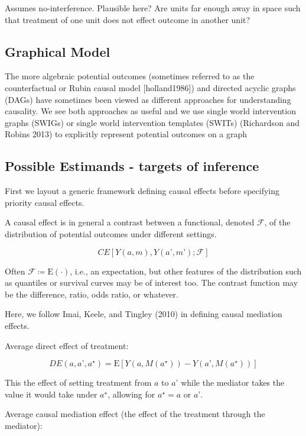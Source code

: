 \documentclass[]{article}
\begin{document}
Assumes no-interference. Plausible here? Are units far enough away in
space such that treatment of one unit does not effect outcome in another
unit?

\subsection{Graphical Model}\label{graphical-model}

The more algebraic potential outcomes (sometimes referred to as the
counterfactual or Rubin causal model {[}holland1986{]}) and directed
acyclic graphs (DAGs) have sometimes been viewed as different approaches
for understanding causality. We see both approaches as useful and we use
single world intervention graphs (SWIGs) or single world intervention
templates (SWITs) (Richardson and Robins 2013) to explicitly represent
potential outcomes on a graph

\subsection{Possible Estimands - targets of
inference}\label{possible-estimands---targets-of-inference}

First we layout a generic framework defining causal effects before
specifying priority causal effects.

A causal effect is in general a contrast between a functional, denoted
\(\mathcal{F}\), of the distribution of potential outcomes under
different settings.

\[
CE[Y(a, m), Y(a’, m’); \mathcal{F}]
\]

Often \(\mathcal{F} \coloneqq \mathrm{E}(\cdot)\), i.e., an expectation,
but other features of the distribution such as quantiles or survival
curves may be of interest too. The contrast function may be the
difference, ratio, odds ratio, or whatever.

Here, we follow Imai, Keele, and Tingley (2010) in defining causal
mediation effects.

Average direct effect of treatment:

\[
DE(a, a’, a^{\star}) = \mathrm{E}[Y(a, M(a^{\star})) - Y(a’, M(a^{\star}))]
\]

This the effect of setting treatment from \(a\) to \(a’\) while the
mediator takes the value it would take under \(a^{\star}\), allowing for
\(a^{\star} = a\) or \(a’\).

Average causal mediation effect (the effect of the treatment through the
mediator):
\end{document}
